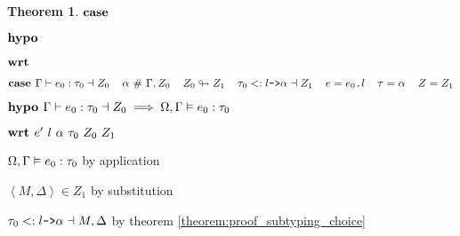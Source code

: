 \documentclass[acmsmall]{acmart}
\theoremstyle{definition}
\newtheorem{theorem}{Theorem}[section]
\begin{document}
\begin{theorem}
  \item \Z {} 
  \item \Z $\textbf{case } $ 
  \item \Z $\textbf{hypo } $ 
  \item \Z $\textbf{wrt } $ 



  \item \Z $\textbf{case } 
    \Gamma \vdash e_0 : \tau_0 \dashv Z_0
    \hspace{4mm}
    \alpha\ \#\ \Gamma, Z_0
    \hspace{4mm}
    Z_0 \looparrowright Z_1
    \hspace{4mm}
    \tau_0 <: \texttt{$l$->$\alpha$} \dashv Z_1
    \hspace{4mm}
    e = \texttt{$e_0$.$l$} \hspace{4mm} \tau = \alpha \hspace{4mm} Z = Z_1
  $
   
  \item \Z $\textbf{hypo } 
    \Gamma \vdash e_0 : \tau_0 \dashv Z_0 
    \implies 
    \Omega, \Gamma \vDash e_0 : \tau_0
  $ 
  \item \Z $\B{wrt } e' \ l \ \alpha \ \tau_0 \ Z_0 \ Z_1$ 

  \item \Z\Z $
    \Omega, \Gamma \vDash e_0 : \tau_0
  $ by application

  \item \Z\Z $
    \left< M, \Delta \right> \in Z_1
  $ by substitution 


  \item \Z\Z $
    \tau_0 <: \texttt{$l$->$\alpha$} \dashv M, \Delta
  $ by theorem \ref{theorem:proof_subtyping_choice}



\end{theorem}
\end{document}
